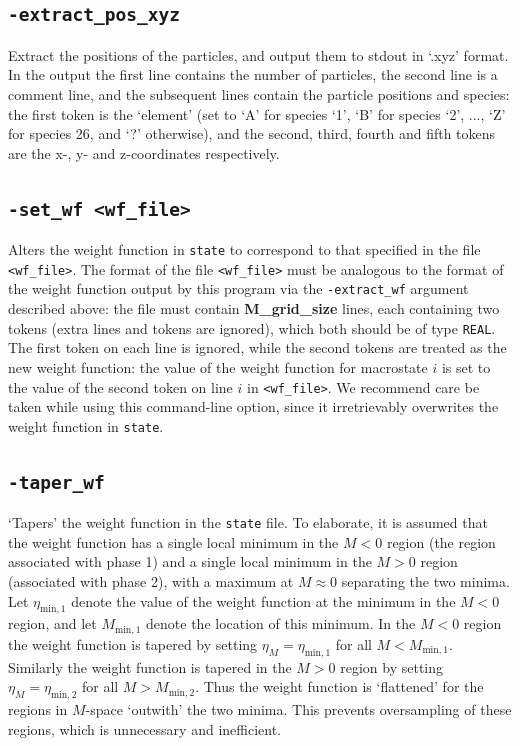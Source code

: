 \documentclass{report}
\begin{document}
\subsection{\texttt{-extract\_pos\_xyz}}
Extract the positions of the particles, and output them to stdout in `.xyz' format. In the output the first line contains the number of 
particles, the second line is a comment line, and the subsequent lines contain the particle positions and species: the first token is 
the `element' (set to `A' for species `1', `B' for species `2', ..., `Z' for species 26, and `?' otherwise), and the second, third, 
fourth and fifth tokens are the x-, y- and z-coordinates respectively.

\subsection{\texttt{-set\_wf <wf\_file>}}
Alters the weight function in \texttt{state} to correspond to that specified in the file \texttt{<wf\_file>}. The format of the file
\texttt{<wf\_file>} must be analogous to the format of the weight function output by this program via the \texttt{-extract\_wf} argument
described above: the file must contain \textbf{M\_grid\_size} lines, each containing two tokens (extra lines and tokens are ignored),
which both should be of type \texttt{REAL}. The first token on each line is ignored, while the second tokens are treated as the new
weight function: the value of the weight function for macrostate $i$ is set to the value of the second token on line $i$ in
\texttt{<wf\_file>}. We recommend care be taken while using this command-line option, since it irretrievably overwrites the weight 
function in \texttt{state}.

\subsection{\texttt{-taper\_wf}}
`Tapers' the weight function in the \texttt{state} file. To elaborate, it is assumed that the weight function has a single local 
minimum in the $M<0$ region (the region associated with phase 1) and a single local minimum in the $M>0$ region (associated with phase 2), with 
a maximum at $M\approx 0$ separating the two minima. Let $\eta_{\text{min},1}$ denote the value of the weight function at the minimum in the $M<0$
region, and let $M_{\text{min},1}$ denote the location of this minimum. In the $M<0$ region the weight function is tapered by setting
$\eta_M=\eta_{\text{min},1}$ for all $M<M_{\text{min},1}$. Similarly the weight function is tapered in the $M>0$ region by setting 
$\eta_M=\eta_{\text{min},2}$ for all $M>M_{\text{min},2}$. Thus the weight function is `flattened' for the regions in $M$-space `outwith' the two minima. 
This prevents oversampling of these regions, which is unnecessary and inefficient.
\end{document}
